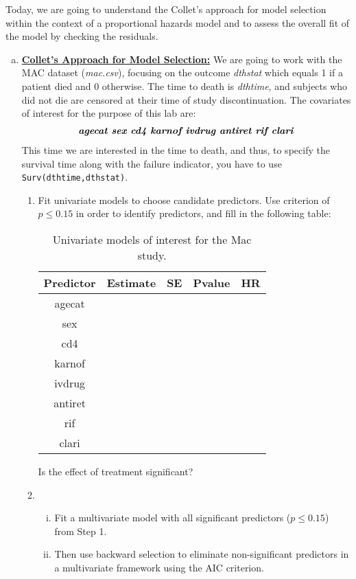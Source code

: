 Today, we are going to understand the Collet’s approach for model selection within the 
context of a proportional hazards model and to assess the overall fit of the model by 
checking the residuals. 
\begin{enumerate}[(a)]
 \item \textbf{\underline{Collet’s Approach for Model Selection:}} We are going to work with the MAC dataset (\emph{mac.csv}), focusing on the outcome 
\emph{dthstat} which equals 1 if a patient died and 0 otherwise. The time to death is 
\emph{dthtime}, and subjects who did not die are censored at their time of study 
discontinuation. 
The covariates of interest for the purpose of this lab are:
\begin{align}
\text{\textbf{\emph{agecat sex cd4 karnof 
ivdrug antiret rif clari}}} \nonumber
\end{align}
This time we are 
interested in the time to death, and thus, to specify the survival time along with the failure indicator, you have to use \verb|Surv(dthtime,dthstat)|.
\begin{enumerate}[Step 1:]
\item Fit univariate models to choose candidate predictors. Use criterion of $p\leq 0.15$ in order to identify predictors, and fill in the following table:
\begin{table}[ht]
\caption{Univariate models of interest for the Mac study.}
\centering
\begin{tabular}{c c c c c}
\hline
Predictor & Estimate & SE & Pvalue & HR \\ \hline
agecat  &&&&  \\   
sex     &&&&  \\
cd4     &&&&  \\
karnof  &&&&  \\   
ivdrug  &&&&  \\   
antiret &&&&  \\    
rif     &&&&  \\
clari   &&&&  \\
\hline
\end{tabular}
\label{table:1}
\end{table}
Is the effect of treatment significant?
\item \begin{enumerate}[(i)]
\item Fit a multivariate model with all significant predictors ($p\leq0.15$) from Step 1.
\item Then use backward selection to eliminate non-significant predictors in a multivariate framework using the AIC criterion.

\end{enumerate}
\end{enumerate}
\end{enumerate}
